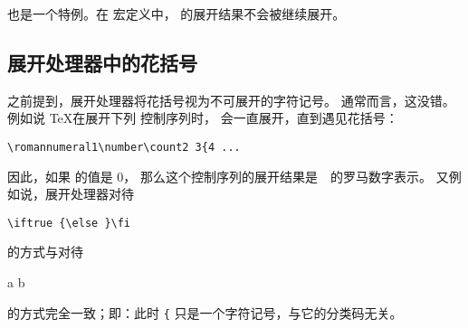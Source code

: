 \documentclass{book}
\begin{document}
 也是一个特例。在  宏定义中，
 的展开结果不会被继续展开。

\subsection{展开处理器中的花括号}

之前提到，展开处理器将花括号视为不可展开的字符记号。
通常而言，这没错。例如说 \TeX 在展开下列  控制序列时，
会一直展开，直到遇见花括号：
\begin{verbatim}
\romannumeral1\number\count2 3{4 ...
\end{verbatim}
因此，如果  的值是 0，
那么这个控制序列的展开结果是~~的罗马数字表示。
又例如说，展开处理器对待
\begin{verbatim}
\iftrue {\else }\fi
\end{verbatim}
的方式与对待
\begin{disp} {\italic a} {\italic b}\end{disp}
的方式完全一致；即：此时 \verb|{| 只是一个字符记号，与它的分类码无关。
\end{document}
